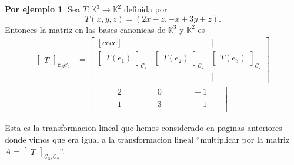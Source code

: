 \documentclass{article}
\theoremstyle{definition}
\theoremstyle{definition}
\newtheorem*{ej}{Por ejemplo}
\theoremstyle{remark}
\begin{document}
\begin{ej}
  Sea $T : \mathbb{K}^3 \to \mathbb{K}^2$ definida por \[
T(x,y,z) = (2x-z,-x+3y+z).
  \]
  Entonces la matriz en las bases canonicas de $\mathbb{K}^3$ y $\mathbb{K}^2$ es \[
    \begin{aligned}
      \begin{bmatrix}T \end{bmatrix}_{\mathcal{C}_3 \mathcal{C}_2} &= \begin{bmatrix}[cccc] | & | & | \\ \begin{bmatrix}T(e_1)\end{bmatrix}_{\mathcal{C}_{2}} & \begin{bmatrix}T(e_2)\end{bmatrix}_{\mathcal{C}_{2}} & \begin{bmatrix}T(e_3)\end{bmatrix}_{\mathcal{C}_{2}} \\ | & | & |\end{bmatrix} \\
                                                                   &= \begin{bmatrix} 
                                                                     \quad \; \phantom{-}2 & \quad \quad \;\; \quad 0 & \quad \quad \quad -1 & \phantom{{}_{1_{1}}}\\
                                                                   \quad  \;-1 & \quad \quad \quad \;\;  3 & \quad \quad \quad \phantom{-}1 & \phantom{{}_{1_{1}}}\end{bmatrix}
    \end{aligned}
  \]
\end{ej}

Esta es la transformacion lineal que hemos considerado en paginas anteriores donde vimos que era igual a la transformacion lineal ``multiplicar por la matriz $A=\begin{bmatrix}T \end{bmatrix}_{\mathcal{C}_{3},\mathcal{C}_2}$''.
\end{document}
